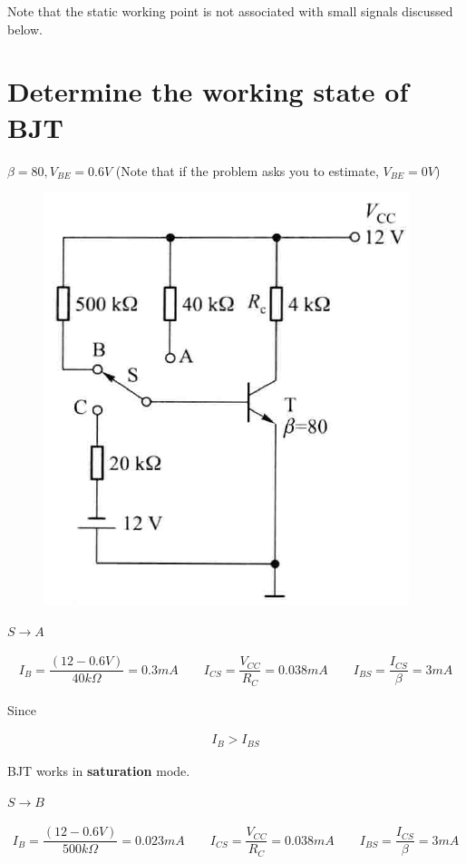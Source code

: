 Note that the static working point is not associated with small signals discussed below.

\section{Determine the working state of BJT}

$\beta = 80, V_{BE} = 0.6 \si{V}$ (Note that if the problem asks you to estimate, $V_{BE} = 0 \si{V}$)

\begin{figure}[H]
  \centering
  \includegraphics[width=0.5\linewidth]{figures/Working-State-BJT}
\end{figure}

$S \rightarrow A$

\begin{equation*}
  \begin{aligned}
    I_B = \dfrac{\left( 12 - 0.6 \si{V} \right)}{40 \si{k \Omega}} = 0.3 \si{mA} \quad\quad
    I_{CS} = \dfrac{V_{CC}}{R_C} = 0.038 \si{mA} \quad\quad
    I_{BS} = \dfrac{I_{CS}}{\beta} = 3 \si{mA} 
  \end{aligned}
\end{equation*}

Since

\begin{equation*}
  \begin{aligned}
    I_B > I_{BS}
  \end{aligned}
\end{equation*}

BJT works in \textbf{saturation} mode.

$S \rightarrow B$

\begin{equation*}
  \begin{aligned}
    I_B = \dfrac{\left( 12 - 0.6 \si{V} \right)}{500 \si{k \Omega}} = 0.023 \si{mA} \quad\quad
    I_{CS} = \dfrac{V_{CC}}{R_C} = 0.038 \si{mA} \quad\quad
    I_{BS} = \dfrac{I_{CS}}{\beta} = 3 \si{mA} 
  \end{aligned}
\end{equation*}

